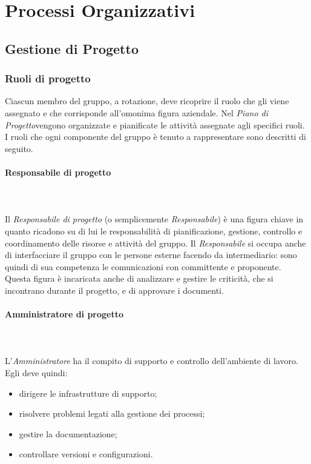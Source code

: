 \section{Processi Organizzativi}

\subsection{Gestione di Progetto}

\subsubsection{Ruoli di progetto}
Ciascun membro del gruppo, a rotazione, deve ricoprire il ruolo che gli viene assegnato e che corrisponde all'omonima figura aziendale. Nel \textit{Piano di Progetto}\glo vengono organizzate e pianificate le attività assegnate agli specifici ruoli. I ruoli che ogni componente del gruppo è tenuto a rappresentare sono descritti di seguito.

\paragraph{Responsabile di progetto}\mbox{} \\ \mbox{} \\
Il \textit{Responsabile di progetto} (o semplicemente \textit{Responsabile}) è una figura chiave in quanto ricadono su di lui le responsabilità di pianificazione, gestione, controllo e coordinamento delle risorse e attività del gruppo. Il \textit{Responsabile} si occupa anche di interfacciare il gruppo con le persone esterne facendo da intermediario: sono quindi di sua competenza le comunicazioni con committente e proponente.
Questa figura è incaricata anche di analizzare e gestire le criticità, che si incontrano durante il progetto, e di approvare i documenti.

\paragraph{Amministratore di progetto}\mbox{} \\ \mbox{} \\
L'\textit{Amministratore} ha il compito di supporto e controllo dell'ambiente di lavoro.
Egli deve quindi:
\begin{itemize}
	\item dirigere le infrastrutture di supporto;
	\item risolvere problemi legati alla gestione dei processi;
	\item gestire la documentazione;
	\item controllare versioni e configurazioni.
\end{itemize}


